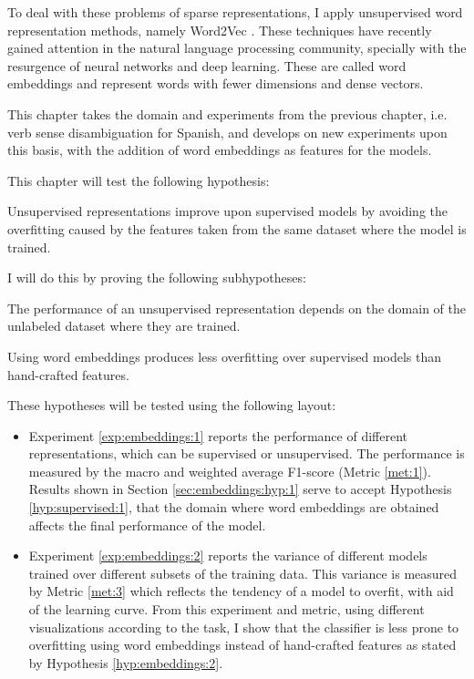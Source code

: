 To deal with these problems of sparse representations, I apply unsupervised
word representation methods, namely Word2Vec \cite{Mikolov2013}. These
techniques have recently gained attention in the natural language processing
community, specially with the resurgence of neural networks and deep learning.
These are called word embeddings and represent words with fewer dimensions and
dense vectors.

This chapter takes the domain and experiments from the previous chapter, i.e.
verb sense disambiguation for Spanish, and develops on new experiments upon
this basis, with the addition of word embeddings as features for the models.

This chapter will test the following hypothesis:

\begin{hypothesis}\label{hyp:embeddings}
  Unsupervised representations improve upon supervised models by avoiding the
  overfitting caused by the features taken from the same dataset where the
  model is trained. 
\end{hypothesis}

I will do this by proving the following subhypotheses:

\begin{subhypothesis}\label{hyp:embeddings:1}
  The performance of an unsupervised representation depends on the domain of
  the unlabeled dataset where they are trained. 
\end{subhypothesis}

\begin{subhypothesis}\label{hyp:embeddings:2}
  Using word embeddings produces less overfitting over supervised models than
  hand-crafted features.
\end{subhypothesis}

These hypotheses will be tested using the following layout:

\begin{itemize}
  \item Experiment \ref{exp:embeddings:1} reports the performance of
    different representations, which can be supervised or
    unsupervised. The performance is measured by the macro and weighted
    average F1-score (Metric \ref{met:1}). Results shown in
    Section \ref{sec:embeddings:hyp:1} serve to accept Hypothesis
    \ref{hyp:supervised:1}, that the domain where word embeddings are obtained
    affects the final performance of the model.
  \item Experiment \ref{exp:embeddings:2} reports the variance of different
    models trained over different subsets of the training data. This variance
    is measured by Metric \ref{met:3} which reflects the tendency of a model to
    overfit, with aid of the learning curve. From this experiment and metric,
    using different visualizations according to the task, I show that the
    classifier is less prone to overfitting using word embeddings instead of
    hand-crafted features as stated by Hypothesis
    \ref{hyp:embeddings:2}. 
\end{itemize}

